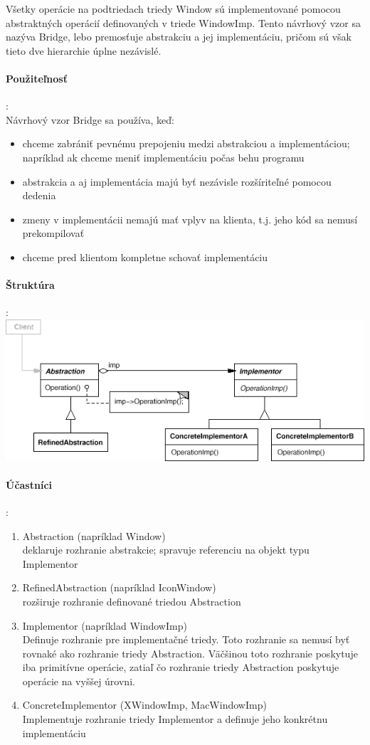 		Všetky operácie na podtriedach triedy Window sú implementované pomocou abstraktných operácií definovaných v triede WindowImp. Tento návrhový vzor sa nazýva Bridge, lebo premosťuje abstrakciu a jej implementáciu, pričom sú však tieto dve hierarchie úplne nezávislé.

	\paragraph{Použiteľnosť}:\\
		Návrhový vzor Bridge sa používa, keď:
		\begin{itemize}
			\item chceme zabrániť pevnému prepojeniu medzi abstrakciou a implementáciou; napríklad ak chceme meniť implementáciu počas behu programu
			\item abstrakcia a aj implementácia majú byť nezávisle rozšíriteľné pomocou dedenia
			\item zmeny v implementácii nemajú mať vplyv na klienta, t.j. jeho kód sa nemusí prekompilovať
			\item chceme pred klientom kompletne schovať implementáciu
		\end{itemize}
	\paragraph{Štruktúra}:\\

		\includegraphics[width=.9\textwidth]{images/programovanie/bridge3}


	\paragraph{Účastníci}:
		\begin{enumerate}
			\item Abstraction (napríklad Window)\\
				deklaruje rozhranie abstrakcie; spravuje referenciu na objekt typu Implementor
			\item RefinedAbstraction (napríklad IconWindow)\\
				rozširuje rozhranie definované triedou Abstraction
			\item Implementor (napríklad WindowImp)\\
				Definuje rozhranie pre implementačné triedy. Toto rozhranie sa nemusí byť rovnaké ako rozhranie triedy Abstraction. Väčšinou toto rozhranie poskytuje iba primitívne operácie, zatiaľ čo rozhranie triedy Abstraction poskytuje operácie na vyššej úrovni.
			\item ConcreteImplementor (XWindowImp, MacWindowImp)\\
				Implementuje rozhranie triedy Implementor a definuje jeho konkrétnu implementáciu
		\end{enumerate}
